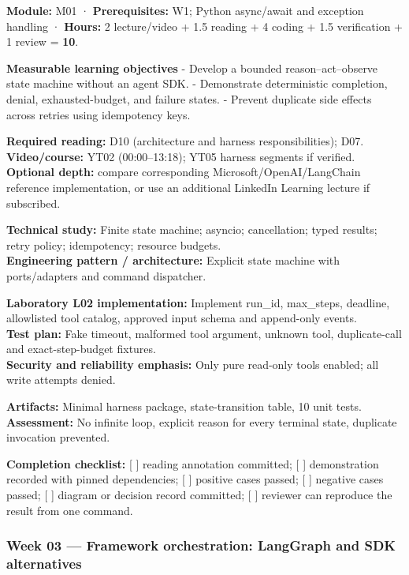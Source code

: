 \documentclass[
  10pt,
]{article}
\begin{document}
\textbf{Module:} M01 · \textbf{Prerequisites:} W1; Python async/await
and exception handling · \textbf{Hours:} 2 lecture/video + 1.5 reading +
4 coding + 1.5 verification + 1 review = \textbf{10}.

\textbf{Measurable learning objectives} - Develop a bounded
reason--act--observe state machine without an agent SDK. - Demonstrate
deterministic completion, denial, exhausted-budget, and failure states.
- Prevent duplicate side effects across retries using idempotency keys.

\textbf{Required reading:} D10 (architecture and harness
responsibilities); D07.\\
\textbf{Video/course:} YT02 (00:00--13:18); YT05 harness segments if
verified.\\
\textbf{Optional depth:} compare corresponding
Microsoft/OpenAI/LangChain reference implementation, or use an
additional LinkedIn Learning lecture if subscribed.

\textbf{Technical study:} Finite state machine; asyncio; cancellation;
typed results; retry policy; idempotency; resource budgets.\\
\textbf{Engineering pattern / architecture:} Explicit state machine with
ports/adapters and command dispatcher.

\textbf{Laboratory L02 implementation:} Implement run\_id, max\_steps,
deadline, allowlisted tool catalog, approved input schema and
append-only events.\\
\textbf{Test plan:} Fake timeout, malformed tool argument, unknown tool,
duplicate-call and exact-step-budget fixtures.\\
\textbf{Security and reliability emphasis:} Only pure read-only tools
enabled; all write attempts denied.

\textbf{Artifacts:} Minimal harness package, state-transition table, 10
unit tests.\\
\textbf{Assessment:} No infinite loop, explicit reason for every
terminal state, duplicate invocation prevented.

\textbf{Completion checklist:} {[} {]} reading annotation committed; {[}
{]} demonstration recorded with pinned dependencies; {[} {]} positive
cases passed; {[} {]} negative cases passed; {[} {]} diagram or decision
record committed; {[} {]} reviewer can reproduce the result from one
command.

\subsubsection{Week 03 --- Framework orchestration: LangGraph and SDK
alternatives}\label{week-03-framework-orchestration-langgraph-and-sdk-alternatives}
\end{document}
